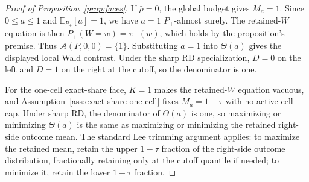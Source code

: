 \documentclass[11pt]{article}
\newcommand{\E}{\mathbb{E}}
\theoremstyle{definition}
\theoremstyle{plain}
\theoremstyle{remark}
\begin{document}
\begin{proof}[Proof of Proposition~\ref{prop:faces}]
If \(\bar\rho=0\), the global budget gives \(M_a=1\).  Since \(0\le a\le1\) and
\(\E_{P_+}[a]=1\), we have \(a=1\) \(P_+\)-almost surely.  The retained-\(W\) equation is
then \(P_+(W=w)=\pi_-(w)\), which holds by the proposition's premise.  Thus
\(\mathcal A(P,0,0)=\{1\}\).  Substituting \(a=1\) into \(\Theta(a)\) gives the displayed
local Wald contrast.  Under the sharp RD specialization, \(D=0\) on the left and \(D=1\)
on the right at the cutoff, so the denominator is one.

For the one-cell exact-share face, \(K=1\) makes the retained-\(W\) equation vacuous, and
Assumption~\ref{ass:exact-share-one-cell} fixes \(M_a=1-\tau\) with no active cell cap.
Under sharp RD, the denominator of \(\Theta(a)\) is one, so maximizing or minimizing
\(\Theta(a)\) is the same as maximizing or minimizing the retained right-side outcome
mean.  The standard Lee trimming argument applies: to maximize the retained mean, retain
the upper \(1-\tau\) fraction of the right-side outcome distribution, fractionally retaining
only at the cutoff quantile if needed; to minimize it, retain the lower \(1-\tau\) fraction.
\end{proof}
\end{document}

